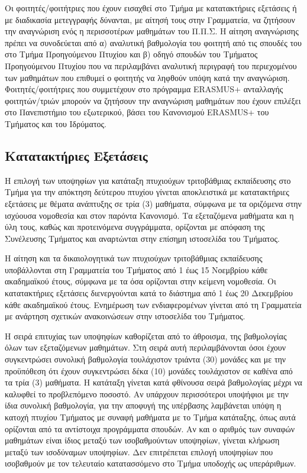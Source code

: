 Οι φοιτητές/φοιτήτριες που έχουν εισαχθεί στο Τμήμα με κατατακτήριες
εξετάσεις ή με διαδικασία μετεγγραφής δύνανται, με αίτησή τους στην
Γραμματεία, να ζητήσουν την αναγνώριση ενός η περισσοτέρων μαθημάτων του
Π.Π.Σ. Η αίτηση αναγνώρισης πρέπει να συνοδεύεται από α) αναλυτική
βαθμολογία του φοιτητή από τις σπουδές του στο Τμήμα Προηγούμενου
Πτυχίου και β) οδηγό σπουδών του Τμήματος Προηγούμενου Πτυχίου που να
περιλαμβάνει αναλυτική περιγραφή του περιεχομένου των μαθημάτων που
επιθυμεί ο φοιτητής να ληφθούν υπόψη κατά την αναγνώριση.
Φοιτητές/φοιτήτριες που συμμετέχουν στο πρόγραμμα ERASMUS+ ανταλλαγής
φοιτητών/τριών μπορούν να ζητήσουν την αναγνώριση μαθημάτων που έχουν
επιλέξει στο Πανεπιστήμιο του εξωτερικού, βάσει του Κανονισμού ERASMUS+
του Τμήματος και του Ιδρύματος.

\hypertarget{ux3baux3b1ux3c4ux3b1ux3c4ux3b1ux3baux3c4ux3aeux3c1ux3b9ux3b5ux3c2-ux3b5ux3beux3b5ux3c4ux3acux3c3ux3b5ux3b9ux3c2}{%
\subsection{Κατατακτήριες
Εξετάσεις}\label{ux3baux3b1ux3c4ux3b1ux3c4ux3b1ux3baux3c4ux3aeux3c1ux3b9ux3b5ux3c2-ux3b5ux3beux3b5ux3c4ux3acux3c3ux3b5ux3b9ux3c2}}

Η επιλογή των υποψηφίων για κατάταξη πτυχιούχων τριτοβάθμιας εκπαίδευσης
στο Τμήμα για την απόκτηση δεύτερου πτυχίου γίνεται αποκλειστικά με
κατατακτήριες εξετάσεις με θέματα ανάπτυξης σε τρία (3) μαθήματα,
σύμφωνα με τα οριζόμενα στην ισχύουσα νομοθεσία και στον παρόντα
Κανονισμό. Τα εξεταζόμενα μαθήματα και η ύλη τους, καθώς και
προτεινόμενα συγγράμματα, ορίζονται με απόφαση της Συνέλευσης Τμήματος
και αναρτώνται στην επίσημη ιστοσελίδα του Τμήματος.

Η αίτηση και τα δικαιολογητικά των πτυχιούχων τριτοβάθμιας εκπαίδευσης
υποβάλλονται στη Γραμματεία του Τμήματος από 1 έως 15 Νοεμβρίου κάθε
ακαδημαϊκού έτους, σύμφωνα με τα όσα ορίζονται στην κείμενη νομοθεσία.
Οι κατατακτήριες εξετάσεις διενεργούνται κατά το διάστημα από 1 έως 20
Δεκεμβρίου κάθε ακαδημαϊκού έτους. Ενημέρωση των ενδιαφερομένων γίνεται
από τη Γραμματεία με ανάρτηση σχετικών ανακοινώσεων στην ιστοσελίδα του
Τμήματος.

Η σειρά επιτυχίας των υποψηφίων καθορίζεται από το άθροισμα, της
βαθμολογίας όλων των εξεταζόμενων μαθημάτων. Στη σειρά αυτή
περιλαμβάνονται όσοι έχουν συγκεντρώσει συνολική βαθμολογία τουλάχιστον
τριάντα (30) μονάδες και με την προϋπόθεση ότι έχουν συγκεντρώσει δέκα
(10) μονάδες τουλάχιστον σε καθένα από τα τρία (3) μαθήματα. Η κατάταξη
γίνεται κατά φθίνουσα σειρά βαθμολογίας μέχρι να καλυφθεί το
προβλεπόμενο ποσοστό. Αν υπάρχουν περισσότεροι υποψήφιοι με την ίδια
συνολική βαθμολογία, για την αποφυγή της υπέρβασης λαμβάνεται υπόψη η
κατοχή πτυχίου Τμήματος με συναφή μαθήματα με το Τμήμα κατάταξης, όπως
αυτά ορίζονται από τα αντίστοιχα προγράμματα σπουδών. Αν και ο αριθμός
των συναφών μαθημάτων είναι ίδιος μεταξύ των ισοβαθμούντων υποψηφίων,
γίνεται κλήρωση μεταξύ των ισοδύναμων υποψηφίων. Δεν επιτρέπεται επιλογή
υποψηφίων που ισοβαθμούν με τον τελευταίο κατατασσόμενο στο Τμήμα
υποδοχής ως υπεράριθμων.

